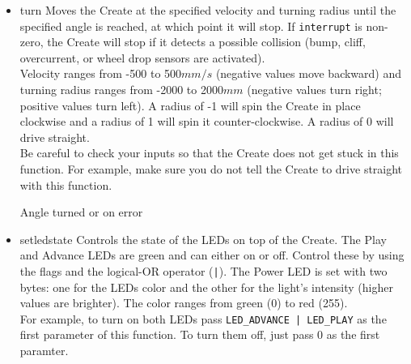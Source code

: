 \documentclass {article}
\begin{document}
\begin {itemize}
  \item {} {turn}
        Moves the Create at the specified velocity and turning radius until the specified angle
        is reached, at which point it will stop.  If {\tt interrupt} is non-zero,
        the Create will stop if it detects a possible collision (bump, cliff, overcurrent, or wheel
        drop sensors are activated). \\
        Velocity ranges from -500 to 500$mm/s$ (negative values move backward) and turning radius
        ranges from -2000 to 2000$mm$ (negative values turn right; positive values turn left).  A
        radius of -1 will spin the Create in place clockwise and a radius of 1 will spin it
        counter-clockwise.  A radius of 0 will drive straight. \\
        Be careful to check your inputs so that the Create does not get stuck in this function.  For
        example, make sure you do not tell the Create to drive straight with this function. \\
        \ret Angle turned or \fail on error 
        
  \item {} {setledstate}
        Controls the state of the LEDs on top of the Create.  The Play and Advance LEDs are green
        and can either on or off.  Control these by using the \oiled flags and the logical-OR
        operator ({\tt |}).  The Power LED is set with two bytes: one for the LEDs color and the
        other for the light's intensity (higher values are brighter).  The color ranges from green
        (0) to red (255). \\
        For example, to turn on both LEDs pass {\tt LED\_ADVANCE | LED\_PLAY} as the first parameter
        of this function.  To turn them off, just pass 0 as the first paramter. \\
        \retnorm


\end{itemize}
\end{document}
